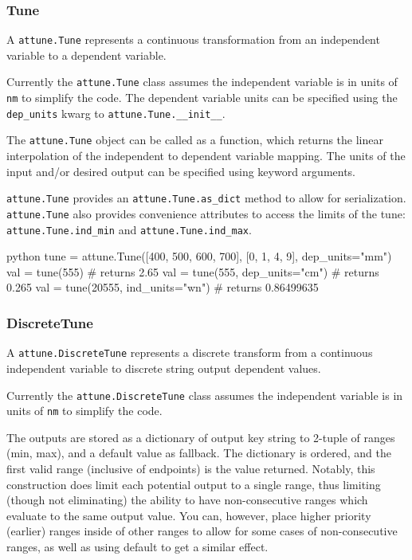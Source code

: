 \hypertarget{tune}{%
\subsubsection{Tune}\label{tune}}

A \texttt{attune.Tune} represents a continuous
transformation from an independent variable to a dependent variable.

Currently the \texttt{attune.Tune} class assumes the
independent variable is in units of \texttt{nm} to simplify the code.
The dependent variable units can be specified using the
\texttt{dep\_units} kwarg to
\texttt{attune.Tune.\_\_init\_\_}.

The \texttt{attune.Tune} object can be called as a
function, which returns the linear interpolation of the independent to
dependent variable mapping. The units of the input and/or desired output
can be specified using keyword arguments.

\texttt{attune.Tune} provides an
\texttt{attune.Tune.as\_dict} method to allow for
serialization. \texttt{attune.Tune} also provides
convenience attributes to access the limits of the tune:
\texttt{attune.Tune.ind\_min} and
\texttt{attune.Tune.ind\_max}.

\begin{codefragment}{python}
tune = attune.Tune([400, 500, 600, 700], [0, 1, 4, 9], dep_units="mm")
val = tune(555) # returns 2.65
val = tune(555, dep_units="cm") # returns 0.265
val = tune(20555, ind_units="wn") # returns 0.86499635
\end{codefragment}

\hypertarget{discretetune}{%
\subsubsection{DiscreteTune}\label{discretetune}}

A \texttt{attune.DiscreteTune} represents a discrete
transform from a continuous independent variable to discrete string
output dependent values.

Currently the \texttt{attune.DiscreteTune} class
assumes the independent variable is in units of \texttt{nm} to simplify
the code.

The outputs are stored as a dictionary of output key string to 2-tuple
of ranges (min, max), and a default value as fallback. The dictionary is
ordered, and the first valid range (inclusive of endpoints) is the value
returned. Notably, this construction does limit each potential output to
a single range, thus limiting (though not eliminating) the ability to
have non-consecutive ranges which evaluate to the same output value. You
can, however, place higher priority (earlier) ranges inside of other
ranges to allow for some cases of non-consecutive ranges, as well as
using default to get a similar effect.

